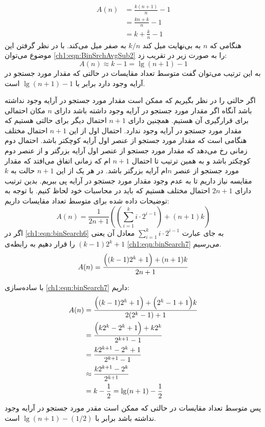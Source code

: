 {\begin{align}
A(n) &= \frac{k(n+1)}{n} - 1\nonumber\\
&=\frac{kn+k}{n} - 1\nonumber\\
&= k+ \frac{k}{n} - 1\label{ch1:eqn:BinSrchAvgSub2}
\end{align}
هنگامی که {$n$} به بی‌نهایت میل کند {$k/n$} به صفر میل می‌کند. با در نظر گرفتن این موضوع می‌توان  {\eqref{ch1:eqn:BinSrchAvgSub2}} را به صورت زیر در تقریب زد:
\begin{displaymath}
A(n) \approx k-1 = \lg (n+1) - 1
\end{displaymath}
به این ترتیب می‌توان گفت متوسط تعداد مقایسات در حالتی که مقدار مورد جستجو در آرایه وجود دارد برابر با {$\lg (n+1) - 1$} است.

اگر حالتی را در نظر بگیریم که ممکن است مقدار مورد جستجو در آرایه وجود نداشته باشد آنگاه اگر مقدار مورد جستجو در آرایه وجود داشته باشد  دارای {$n$} مکان احتمالی برای قرارگیری آن هستیم. همچنین دارای {$n+1$} احتمال دیگر برای حالتی هستیم که مقدار مورد جستجو در آرایه وجود ندارد. احتمال اول از این {$n+1$} احتمال مختلف هنگامی است که مقدار مورد جستجو از عنصر اول آرایه کوچکتر باشد. احتمال دوم زمانی رخ می‌دهد که مقدار مورد جستجو از عنصر اول آرایه بزرگتر و از عنصر دوم کوچکتر باشد و به همین ترتیب تا احتمال {$n+1$} ام که زمانی اتفاق می‌افتد که مقدار مورد جستجو از عنصر {$n$}ام آرایه بزرگتر باشد. در هر یک از این {$n+1$} حالت به {$k$} مقایسه نیاز داریم تا به عدم وجود مقدار مورد جستجو در آرایه پی ‌ببریم. بدین ترتیب دارای {$2n+1$} احتمال مختلف هستیم که باید در محاسبات خود لحاظ کنیم. با توجه به توضیحات داده شده برای متوسط تعداد مقایسات داریم:
\begin{equation}
A(n)= \frac{1}{2n+1}\left( \left( \sum_{i=1}^{k}{i \cdot 2^{i-1}} \right) + (n+1)k  \right)\label{ch1:eqn:binSearch6}
\end{equation}
اگر در {\eqref{ch1:eqn:binSearch6}} به جای عبارت {$\sum_{i=1}^{k}{i \cdot 2^{i-1}}$} معادل آن یعنی {$ (k-1)2^{k} + 1$} را قرار دهیم به رابطه‌ی {\eqref{ch1:eqn:binSearch7}} می‌رسیم.
\begin{equation}
A(n) = \frac{ \Bigl( (k-1)2^{k} + 1 \Bigr) + (n+1)k}{2n+1}\label{ch1:eqn:binSearch7}
\end{equation}

با ساده‌سازی {\eqref{ch1:eqn:binSearch7}} داریم:
\begin{align*}
A(n) &= \frac{ \Bigl( (k-1)2^{k} + 1 \Bigr) + \Bigl( 2^k -1+1 \Bigr) k}{2(2^k -1)+1} \\
&= \frac{ \Bigl( k2^{k}-2^{k} + 1 \Bigr) + k2^k}{2^{k+1}-1} \\
&= \frac{ k2^{k+1}-2^{k} + 1}{2^{k+1}-1} \\
&\approx \frac{ k2^{k+1}-2^{k}}{2^{k+1}} \\
&= k - \frac{1}{2} = \lg (n+1) - \frac{1}{2}
\end{align*}
پس متوسط تعداد مقایسات در حالتی که ممکن است مقدر مورد جستجو در آرایه وجود نداشته باشد برابر با {$\lg (n+1) - (1/2)$} است.

}
